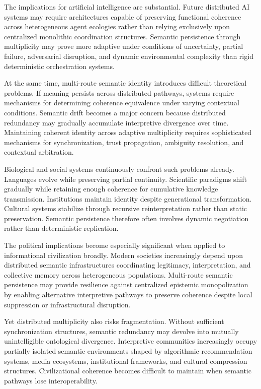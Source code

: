 \documentclass[11pt,a4paper]{article}
\begin{document}
The implications for artificial intelligence are substantial. Future distributed AI systems may require architectures capable of preserving functional coherence across heterogeneous agent ecologies rather than relying exclusively upon centralized monolithic coordination structures. Semantic persistence through multiplicity may prove more adaptive under conditions of uncertainty, partial failure, adversarial disruption, and dynamic environmental complexity than rigid deterministic orchestration systems.

At the same time, multi-route semantic identity introduces difficult theoretical problems. If meaning persists across distributed pathways, systems require mechanisms for determining coherence equivalence under varying contextual conditions. Semantic drift becomes a major concern because distributed redundancy may gradually accumulate interpretive divergence over time. Maintaining coherent identity across adaptive multiplicity requires sophisticated mechanisms for synchronization, trust propagation, ambiguity resolution, and contextual arbitration.

Biological and social systems continuously confront such problems already. Languages evolve while preserving partial continuity. Scientific paradigms shift gradually while retaining enough coherence for cumulative knowledge transmission. Institutions maintain identity despite generational transformation. Cultural systems stabilize through recursive reinterpretation rather than static preservation. Semantic persistence therefore often involves dynamic negotiation rather than deterministic replication.

The political implications become especially significant when applied to informational civilization broadly. Modern societies increasingly depend upon distributed semantic infrastructures coordinating legitimacy, interpretation, and collective memory across heterogeneous populations. Multi-route semantic persistence may provide resilience against centralized epistemic monopolization by enabling alternative interpretive pathways to preserve coherence despite local suppression or infrastructural disruption.

Yet distributed multiplicity also risks fragmentation. Without sufficient synchronization structures, semantic redundancy may devolve into mutually unintelligible ontological divergence. Interpretive communities increasingly occupy partially isolated semantic environments shaped by algorithmic recommendation systems, media ecosystems, institutional frameworks, and cultural compression structures. Civilizational coherence becomes difficult to maintain when semantic pathways lose interoperability.
\end{document}
